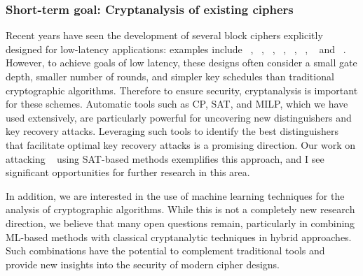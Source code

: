 \subsubsection{Short-term goal: Cryptanalysis of existing ciphers}
Recent years have seen the development of several block ciphers explicitly designed for low-latency applications: examples include ~\cite{DBLP:conf/asiacrypt/BorghoffCGKKKLNPRRTY12}, ~\cite{DBLP:conf/sacrypt/BozilovEKLLMNRT20},  ~\cite{DBLP:conf/crypto/BeierleJKL0PSSS16}, ~\cite{DBLP:journals/tosc/Avanzi17}, ~\cite{DBLP:journals/tosc/AvanziBDEGNR23}, ~\cite{DBLP:conf/eurocrypt/BelkheyarDGLMPRSSAV25}, ~\cite{DBLP:conf/uss/CanaleGLTTU23} and ~\cite{cryptoeprint:2024/1240}.
However, to achieve goals of low latency, these designs often consider a small gate depth, smaller number of rounds, and simpler key schedules than traditional cryptographic algorithms.
Therefore to ensure security, cryptanalysis is important for these schemes. 
Automatic tools such as CP, SAT, and MILP, which we have used extensively, are particularly powerful for uncovering new distinguishers and key recovery attacks.
Leveraging such tools to identify the best distinguishers that facilitate optimal key recovery attacks is a promising direction.
Our work on attacking ~ using SAT-based methods exemplifies this approach, and I see significant opportunities for further research in this area.

In addition, we are interested in the use of machine learning techniques for the analysis of cryptographic algorithms.
While this is not a completely new research direction, we believe that many open questions remain, particularly in combining ML-based methods with classical cryptanalytic techniques in hybrid approaches.
Such combinations have the potential to complement traditional tools and provide new insights into the security of modern cipher designs.


